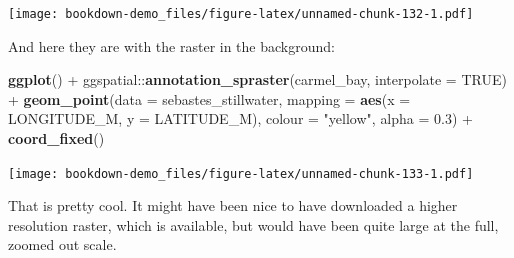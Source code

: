 \documentclass[]{book}
\newenvironment{Shaded}{\begin{snugshade}}{\end{snugshade}}
\newcommand{\KeywordTok}[1]{\textcolor[rgb]{0.13,0.29,0.53}{\textbf{{#1}}}}
\newcommand{\DataTypeTok}[1]{\textcolor[rgb]{0.13,0.29,0.53}{{#1}}}
\newcommand{\FloatTok}[1]{\textcolor[rgb]{0.00,0.00,0.81}{{#1}}}
\newcommand{\StringTok}[1]{\textcolor[rgb]{0.31,0.60,0.02}{{#1}}}
\newcommand{\OtherTok}[1]{\textcolor[rgb]{0.56,0.35,0.01}{{#1}}}
\newcommand{\NormalTok}[1]{{#1}}
\theoremstyle{definition}
\theoremstyle{definition}
\theoremstyle{remark}
\begin{document}
\texttt{[image: bookdown-demo\_files/figure-latex/unnamed-chunk-132-1.pdf]}

And here they are with the raster in the background:

\begin{Shaded}
\begin{Highlighting}[]
\KeywordTok{ggplot}\NormalTok{() +}
\StringTok{  }\NormalTok{ggspatial::}\KeywordTok{annotation_spraster}\NormalTok{(carmel_bay, }\DataTypeTok{interpolate =} \OtherTok{TRUE}\NormalTok{) +}
\StringTok{  }\KeywordTok{geom_point}\NormalTok{(}\DataTypeTok{data =} \NormalTok{sebastes_stillwater, }\DataTypeTok{mapping =} \KeywordTok{aes}\NormalTok{(}\DataTypeTok{x =} \NormalTok{LONGITUDE_M, }\DataTypeTok{y =} \NormalTok{LATITUDE_M), }
             \DataTypeTok{colour =} \StringTok{"yellow"}\NormalTok{,}
             \DataTypeTok{alpha =} \FloatTok{0.3}\NormalTok{) +}
\StringTok{  }\KeywordTok{coord_fixed}\NormalTok{()}
\end{Highlighting}
\end{Shaded}

\texttt{[image: bookdown-demo\_files/figure-latex/unnamed-chunk-133-1.pdf]}

That is pretty cool. It might have been nice to have downloaded a higher
resolution raster, which is available, but would have been quite large
at the full, zoomed out scale.


\end{document}
